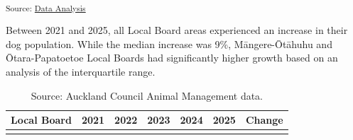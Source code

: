 \documentclass[
  letterpaper,
  DIV=11,
  numbers=noendperiod]{scrartcl}
\begin{document}
\textsubscript{Source:
\href{https://tesaunders.github.io/dog-control/notebooks/data-analysis-preview.html\#cell-tbl-region-pop}{Data
Analysis}}

Between 2021 and 2025, all Local Board areas experienced an increase in
their dog population. While the median increase was 9\%, Māngere-Ōtāhuhu
and Ōtara-Papatoetoe Local Boards had significantly higher growth based
on an analysis of the interquartile range.

{

\begin{longtable}[]{@{}lllllll@{}}

\toprule\noalign{}
Local Board & 2021 & 2022 & 2023 & 2024 & 2025 & Change \\
\midrule\noalign{}
\endhead
\bottomrule\noalign{}

\caption{\label{tbl-board-pop}Source: Auckland Council Animal Management
data.}

\tabularnewline


\end{longtable}}
\end{document}
